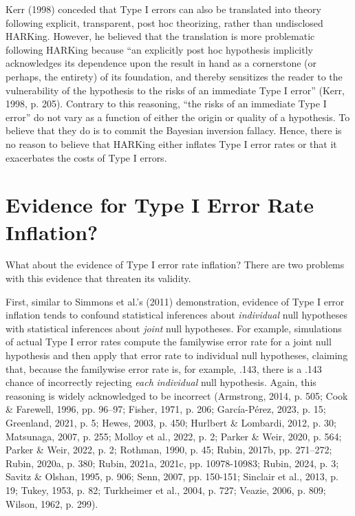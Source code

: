 \documentclass[authordate, empirical]{jote-new-article}
\begin{document}
	Kerr (1998) conceded that Type I errors can also be translated into theory following explicit, transparent, post hoc theorizing, rather than undisclosed HARKing. However, he believed that the translation is more problematic following HARKing because “an explicitly post hoc hypothesis implicitly acknowledges its dependence upon the result in hand as a cornerstone (or perhaps, the entirety) of its foundation, and thereby sensitizes the reader to the vulnerability of the hypothesis to the risks of an immediate Type I error” (Kerr, 1998, p. 205). Contrary to this reasoning, “the risks of an immediate Type I error” do not vary as a function of either the origin or quality of a hypothesis. To believe that they do is to commit the Bayesian inversion fallacy. Hence, there is no reason to believe that HARKing either inflates Type I error rates or that it exacerbates the costs of Type I errors.



	\section{Evidence for Type I Error Rate Inflation?}



	What about the evidence of Type I error rate inflation? There are two problems with this evidence that threaten its validity.



	First, similar to Simmons et al.'s (2011) demonstration, evidence of Type I error inflation tends to confound statistical inferences about \emph{individual} null hypotheses with statistical inferences about \emph{joint} null hypotheses. For example, simulations of actual Type I error rates compute the familywise error rate for a joint null hypothesis and then apply that error rate to individual null hypotheses, claiming that, because the familywise error rate is, for example, .143, there is a .143 chance of incorrectly rejecting \emph{each} \emph{individual }null hypothesis. Again, this reasoning is widely acknowledged to be incorrect (Armstrong, 2014, p. 505; Cook \& Farewell, 1996, pp. 96--97; Fisher, 1971, p. 206; García-Pérez, 2023, p. 15; Greenland, 2021, p. 5; Hewes, 2003, p. 450; Hurlbert \& Lombardi, 2012, p. 30; Matsunaga, 2007, p. 255; Molloy et al., 2022, p. 2; Parker \& Weir, 2020, p. 564; Parker \& Weir, 2022, p. 2; Rothman, 1990, p. 45; Rubin, 2017b, pp. 271--272; Rubin, 2020a, p. 380; Rubin, 2021a, 2021c, pp. 10978-10983; Rubin, 2024, p. 3; Savitz \& Olshan, 1995, p. 906; Senn, 2007, pp. 150-151; Sinclair et al., 2013, p. 19; Tukey, 1953, p. 82; Turkheimer et al., 2004, p. 727; Veazie, 2006, p. 809; Wilson, 1962, p. 299).
\end{document}
